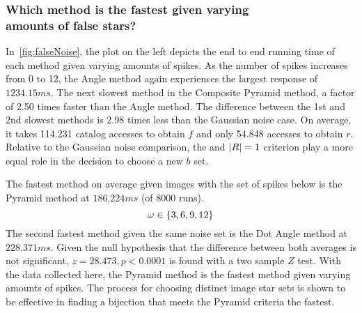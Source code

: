 \subsubsection{Which method is the fastest given varying \\ amounts of false stars?}
In~\autoref{fig:falseNoise}, the plot on the left depicts the end to end running time of each method given varying
amounts of spikes.
As the number of spikes increases from 0 to 12, the Angle method again experiences the largest response of
$1234.15\si{ms}$.
The next slowest method in the Composite Pyramid method, a factor of 2.50 times faster than the Angle method.
The difference between the 1st and 2nd slowest methods is 2.98 times less than the Gaussian noise case.
On average, it takes 114.231 catalog accesses to obtain $f$ and only 54.848 accesses to obtain $r$.
Relative to the Gaussian noise comparison, the  and $\left| R \right| = 1$ criterion play a more equal role in
the decision to choose a new $b$ set.

%
%
%
%
The fastest method on average given images with the set of spikes below is the Pyramid method at $186.224\si{ms}$
(of 8000 runs).
\begin{equation}\label{eq:numberOfSpikes}
    \omega \in \set{ 3, 6, 9, 12 }
\end{equation}
The second fastest method given the same noise set is the Dot Angle method at $228.371\si{ms}$.
Given the null hypothesis that the difference between both averages is not significant, $z = 28.473, p < 0.0001$ is
found with a two sample $Z$ test.
With the data collected here, the Pyramid method is the fastest method given varying amounts of spikes.
The process for choosing distinct image star sets is shown to be effective in finding a bijection that meets the Pyramid
criteria the fastest.

